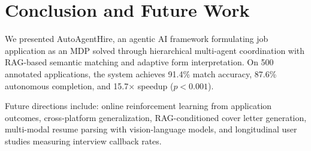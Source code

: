 \documentclass[conference]{IEEEtran}
\begin{document}
\section{Conclusion and Future Work}

We presented AutoAgentHire, an agentic AI framework formulating job application as an MDP solved through hierarchical multi-agent coordination with RAG-based semantic matching and adaptive form interpretation. On 500 annotated applications, the system achieves 91.4\% match accuracy, 87.6\% autonomous completion, and 15.7$\times$ speedup ($p < 0.001$).

Future directions include: online reinforcement learning from application outcomes, cross-platform generalization, RAG-conditioned cover letter generation, multi-modal resume parsing with vision-language models, and longitudinal user studies measuring interview callback rates.

\balance

\end{document}
